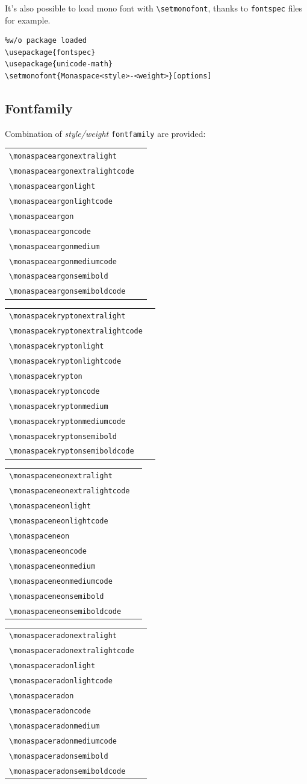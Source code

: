 \documentclass[a4paper]{scrartcl}
\newcommand*{\opt}[1]{\texttt{#1}}
\newcommand*{\cmd}[1]{\texttt{\textbackslash #1}}\newcommand*{\showtchar}[1]{\cmd{#1}~\csname #1\endcsname}
\newcommand\samplettxt{oO08 iIlL1 g9qCGQ <=>}
\newcommand\samplett[1][]{\cmd{#1} & \fbox{\csname#1\endcsname\samplettxt} \\}
\begin{document}
It's also possible to load mono font with \cmd{setmonofont}, thanks to \opt{fontspec} files for example.

\begin{verbatim}
%w/o package loaded
\usepackage{fontspec}
\usepackage{unicode-math}
\setmonofont{Monaspace<style>-<weight>}[options]
\end{verbatim}

\subsection{Fontfamily}

Combination of \textit{style/weight} \opt{fontfamily} are provided:

\begin{tabular}{ll}
	\samplett[monaspaceargonextralight]
	\samplett[monaspaceargonextralightcode]
	\samplett[monaspaceargonlight]
	\samplett[monaspaceargonlightcode]
	\samplett[monaspaceargon]
	\samplett[monaspaceargoncode]
	\samplett[monaspaceargonmedium]
	\samplett[monaspaceargonmediumcode]
	\samplett[monaspaceargonsemibold]
	\samplett[monaspaceargonsemiboldcode]
\end{tabular}

\begin{tabular}{ll}
	\samplett[monaspacekryptonextralight]
	\samplett[monaspacekryptonextralightcode]
	\samplett[monaspacekryptonlight]
	\samplett[monaspacekryptonlightcode]
	\samplett[monaspacekrypton]
	\samplett[monaspacekryptoncode]
	\samplett[monaspacekryptonmedium]
	\samplett[monaspacekryptonmediumcode]
	\samplett[monaspacekryptonsemibold]
	\samplett[monaspacekryptonsemiboldcode]
\end{tabular}

\begin{tabular}{ll}
	\samplett[monaspaceneonextralight]
	\samplett[monaspaceneonextralightcode]
	\samplett[monaspaceneonlight]
	\samplett[monaspaceneonlightcode]
	\samplett[monaspaceneon]
	\samplett[monaspaceneoncode]
	\samplett[monaspaceneonmedium]
	\samplett[monaspaceneonmediumcode]
	\samplett[monaspaceneonsemibold]
	\samplett[monaspaceneonsemiboldcode]
\end{tabular}

\begin{tabular}{ll}
	\samplett[monaspaceradonextralight]
	\samplett[monaspaceradonextralightcode]
	\samplett[monaspaceradonlight]
	\samplett[monaspaceradonlightcode]
	\samplett[monaspaceradon]
	\samplett[monaspaceradoncode]
	\samplett[monaspaceradonmedium]
	\samplett[monaspaceradonmediumcode]
	\samplett[monaspaceradonsemibold]
	\samplett[monaspaceradonsemiboldcode]
\end{tabular}
\end{document}

